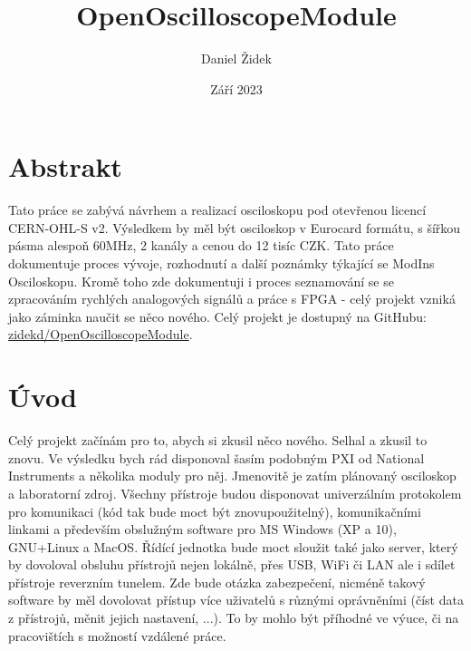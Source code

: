 \documentclass[12pt]{article}
\title{OpenOscilloscopeModule}
\author{Daniel Židek}
\date{Září 2023}
\renewcommand{\listfigurename}{Seznam obrázků}
\renewcommand{\listtablename}{Seznam tabulek}
\begin{document}





\setcounter{page}{2}

\tableofcontents

\newpage

\renewcommand{\listfigurename}{Seznam obrázků}
\listoffigures

\newpage

\renewcommand{\listtablename}{Seznam tabulek}
\listoftables

\newpage

\section{Abstrakt}

Tato práce se zabývá návrhem a realizací osciloskopu pod otevřenou licencí CERN-OHL-S v2.
Výsledkem by měl být osciloskop v Eurocard formátu, s šířkou pásma alespoň 60MHz, 
2 kanály a cenou do 12 tisíc CZK. Tato práce dokumentuje proces vývoje,
rozhodnutí a další poznámky týkající se ModIns Osciloskopu. Kromě toho zde
dokumentuji i proces seznamování se se zpracováním rychlých analogových
signálů a práce s FPGA - celý projekt vzniká jako záminka naučit se něco nového.
Celý projekt je dostupný na GitHubu:
\href{https://github.com/zidekd/OpenOscilloscopeModule}{zidekd/OpenOscilloscopeModule}.

\newpage

\section{Úvod}

Celý projekt začínám pro to, abych si zkusil něco nového.
Selhal a zkusil to znovu. Ve výsledku bych rád disponoval šasím
podobným PXI od National Instruments a několika moduly pro něj.
Jmenovitě je zatím plánovaný osciloskop a laboratorní zdroj.
Všechny přístroje budou disponovat univerzálním protokolem pro
komunikaci (kód tak bude moct být znovupoužitelný), komunikačními
linkami a především obslužným software pro MS Windows (XP a 10),
GNU+Linux a MacOS. Řídící jednotka bude moct sloužit také jako server,
který by dovoloval obsluhu přístrojů nejen lokálně, přes USB, WiFi či LAN
ale i sdílet přístroje reverzním tunelem. Zde bude otázka zabezpečení,
nicméně takový software by měl dovolovat přístup více uživatelů s
různými oprávněními (číst data z přístrojů, měnit jejich nastavení, ...).
To by mohlo být příhodné ve výuce, či na pracovištích s možností vzdálené práce.
\end{document}
